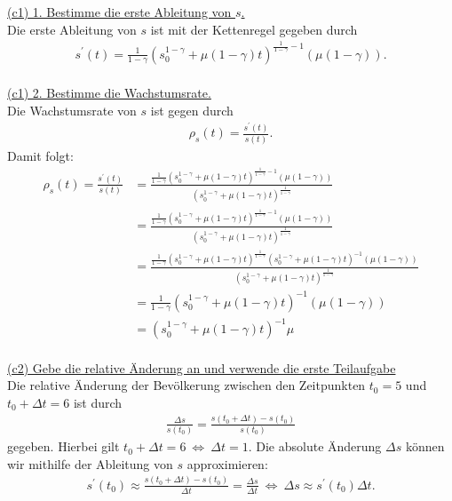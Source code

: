 \underline{(c1) 1. Bestimme die erste Ableitung von $s$.}\\
Die erste Ableitung von $s$ ist mit der Kettenregel gegeben durch
\begin{align*}
	s^\prime(t) = 
	\frac{1}{1- \gamma} 
	\left(s_0^{1-\gamma} + \mu(1-\gamma) t\right)^{\frac{1}{1- \gamma} -1 } 
	(\mu(1-\gamma)).
\end{align*}
\ \\
\underline{(c1) 2. Bestimme die Wachstumsrate.}\\
Die Wachstumsrate von $s$ ist gegen durch
\begin{align*}
	\rho_s(t) = \frac{s^\prime(t)}{s(t)}. 
\end{align*}
Damit folgt:
\allowdisplaybreaks
\begin{align*}
	\rho_s(t) = \frac{s^\prime(t)}{s(t)}
	&=
	\frac{
	\frac{1}{1- \gamma} 
	\left(s_0^{1-\gamma} + \mu(1-\gamma) t\right)^{\frac{1}{1- \gamma} -1 } 
	(\mu(1-\gamma))
	}{
	\left(s_0^{1- \gamma} + \mu (1 - \gamma)  t \right)^{\frac{1}{1- \gamma}}
	}\\
	&=
	\frac{
		\frac{1}{1- \gamma} 
		\left(s_0^{1-\gamma} + \mu(1-\gamma) t\right)^{\frac{1}{1- \gamma} -1 } 
		(\mu(1-\gamma))
	}{
		\left(s_0^{1- \gamma} + \mu (1 - \gamma)  t \right)^{\frac{1}{1- \gamma}}
	}\\
	&=
	\frac{
		\frac{1}{1- \gamma} 
		\left(s_0^{1-\gamma} + \mu(1-\gamma) t\right)^{\frac{1}{1- \gamma}} 
		\left(s_0^{1-\gamma} + \mu(1-\gamma) t\right)^{ -1 }
		(\mu(1-\gamma))
	}{
		\left(s_0^{1- \gamma} + \mu (1 - \gamma)  t \right)^{\frac{1}{1- \gamma}}
	}\\
	&=
		\frac{1}{1- \gamma} 
		\left(s_0^{1-\gamma} + \mu(1-\gamma) t\right)^{ -1 }
		(\mu(1-\gamma))\\
	&=
		\left(s_0^{1-\gamma} + \mu(1-\gamma) t\right)^{ -1 }
		\mu
\end{align*}
\ \\
\underline{(c2) Gebe die relative Änderung an und verwende die erste Teilaufgabe}\\
Die relative Änderung der Bevölkerung zwischen den Zeitpunkten $t_0=5 $ und $t_0 + \Delta t = 6$ ist durch 
\begin{align*}
	\frac{\Delta s}{s(t_0)}
	=
	\frac{s(t_0 + \Delta t) - s(t_0)}{s(t_0)}
\end{align*}
gegeben. Hierbei gilt $t_0 + \Delta t = 6 \ \Leftrightarrow \ \Delta t = 1$.
Die absolute Änderung $\Delta s$ können wir mithilfe der Ableitung von $s$ approximieren:
\begin{align*}
	s^\prime(t_0) \approx \frac{s(t_0 + \Delta t) - s(t_0)}{\Delta t}
	= \frac{\Delta s}{\Delta t}
	\ 
	\Leftrightarrow 
	\
	\Delta s \approx s^\prime(t_0) \Delta t. 
\end{align*}
